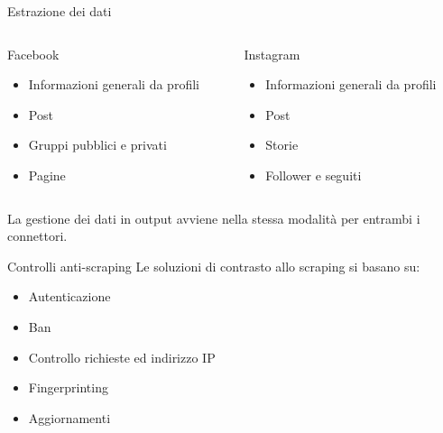 \begin{frame}{Estrazione dei dati}
\begin{columns}
\begin{column}{0.5\textwidth}
\centering
\alert{Facebook}\\
\begin{itemize}
    \item Informazioni generali da profili 
    \item Post
    \item Gruppi pubblici e privati
    \item Pagine
\end{itemize}
\end{column}

\begin{column}{0.5\textwidth}
\centering
\alert{Instagram}\\
\begin{itemize}
    \item Informazioni generali da profili
    \item Post
    \item Storie
    \item Follower e seguiti
\end{itemize}
\end{column}
\end{columns}\leavevmode\newline

La gestione dei dati in output avviene nella stessa modalit\`a per entrambi i connettori.  
\begin{figure}
  \begin{center}
  
\end{center}
\end{figure}

\end{frame}

\begin{frame}{Controlli anti-scraping}
Le soluzioni di \alert{contrasto} allo scraping si basano su:
\begin{itemize}

    \item Autenticazione
    \item Ban
    \item Controllo richieste ed indirizzo IP
    \item Fingerprinting
    \item Aggiornamenti
\end{itemize}
\end{frame}

